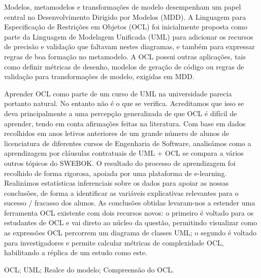 
Modelos, metamodelos e transformações de modelo desempenham um papel central no Desenvolvimento Dirigido por Modelos (MDD). A Linguagem para Especificação de Restrições em Objetos (OCL) foi inicialmente proposta como parte da Linguagem de Modelagem Unificada (UML) para adicionar os recursos de precisão e validação que faltavam nestes diagramas, e também para expressar regras de boa formação no metamodelo. A OCL possui outras aplicações, tais como definir métricas de desenho, modelos de geração de código ou regras de validação para transformações de modelo, exigidas em MDD. 

Aprender OCL como parte de um curso de UML na universidade parecia portanto natural. No entanto não é o que se verifica. Acreditamos que isso se deva principalmente a uma percepção generalizada de que OCL é difícil de aprender, tendo em conta afirmações feitas na literatura. Com base em dados recolhidos em anos letivos anteriores de um grande número de alunos de licenciatura de diferentes cursos de Engenharia de Software, analisámos como a aprendizagem por cláusulas contratuais de UML + OCL se compara a vários outros tópicos do SWEBOK. O resultado do processo de aprendizagem foi recolhido de forma rigorosa, apoiada por uma plataforma de e-learning. Realizámos estatísticas inferenciais sobre os dados para apoiar as nossas conclusões, de forma a identificar as variáveis explicativas relevantes para o sucesso / fracasso dos alunos. As conclusões obtidas levaram-nos a estender uma ferramenta OCL existente com dois recursos novos: o primeiro é voltado para os estudantes de OCL e vai direto ao núcleo da questão, permitindo visualizar como as expressões OCL percorrem um diagrama de classes UML; o segundo é voltado para investigadores e permite calcular métricas de complexidade OCL, habilitando a réplica de um estudo como este.

\begin{keywords}
OCL; UML; Realce do modelo; Compreensão do OCL.
\end{keywords}
